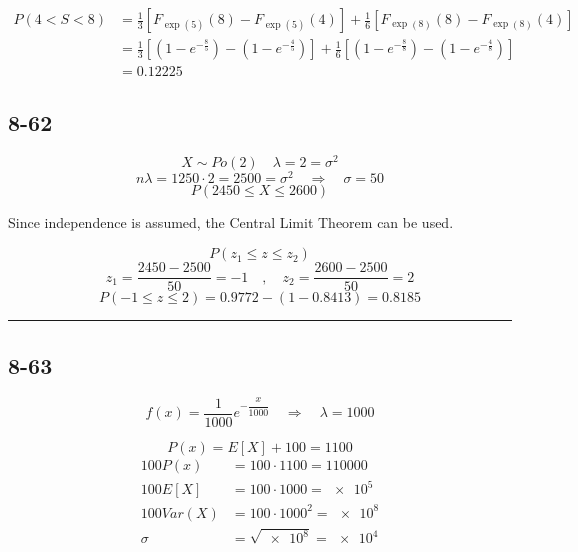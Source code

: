 \documentclass{article}
\newcommand{\qline}{\par\noindent\rule{4.5in}{1pt}}
\begin{document}
			\begin{equation*}
				\begin{split}
					P(4 < S < 8) &= \frac{1}{3} \left[ F_{\exp(5)}(8) - F_{\exp(5)}(4) \right] + \frac{1}{6} \left[ F_{\exp(8)}(8) - F_{\exp(8)}(4) \right] \\
					&= \frac{1}{3} \left[ \left( 1 - e^{-\frac{8}{5}} \right) - \left( 1 - e^{-\frac{4}{5}} \right) \right] + \frac{1}{6} \left[ \left( 1 - e^{-\frac{8}{8}} \right) - \left( 1 - e^{-\frac{4}{8}} \right) \right] \\
					&= \boxed{\num{0.12225}}
				\end{split}
			\end{equation*}

	\clearpage

		\subsection*{8-62}

			\[
				X \sim Po(2) \quad \lambda = 2 = \sigma^2
			\]
			\[
				n\lambda = 1250 \cdot 2 = 2500 = \sigma^2 \quad \Rightarrow \quad \sigma = 50
			\]
			\[
				P(2450 \leq X \leq 2600)
			\]
			\begin{center}
				Since independence is assumed, the Central Limit Theorem can be used.
			\end{center}
			\[
				P(z_1 \leq z \leq z_2)
			\]
			\[
				z_1 = \frac{2450 - 2500}{50} = -1 \quad,\quad z_2 = \frac{2600 - 2500}{50} = 2
			\]
			\[
				P(-1 \leq z \leq 2) = 0.9772 - (1 - 0.8413) = \boxed{0.8185}
			\]

	\qline

		\subsection*{8-63}

			\[
				f(x) = \frac{1}{1000} e^{-\dfrac{x}{1000}} \quad \Rightarrow \quad \lambda = 1000
			\]

			\[
				P(x) = E[X] + 100 = 1100
			\]
			\begin{equation*}
				\begin{split}
					100P(x) &= 100 \cdot 1100 = 110000 \\
					100E[X] &= 100 \cdot 1000 = \num{e5} \\
					100Var(X) &= 100 \cdot 1000^2 = \num{e8} \\
					\sigma &= \sqrt{\num{e8}} = \num{e4}
				\end{split}
			\end{equation*}
\end{document}
